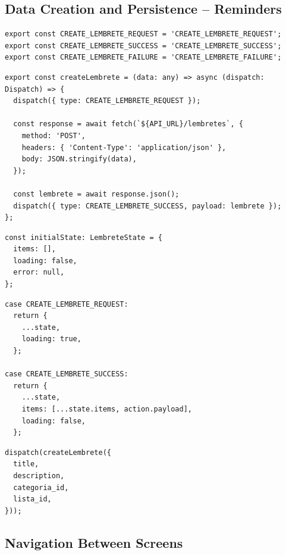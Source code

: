 \documentclass[runningheads,a4paper]{llncs}
\begin{document}
\subsection{Data Creation and Persistence – Reminders}

\begin{lstlisting}[caption={Reminder Creation Action Types}]
export const CREATE_LEMBRETE_REQUEST = 'CREATE_LEMBRETE_REQUEST';
export const CREATE_LEMBRETE_SUCCESS = 'CREATE_LEMBRETE_SUCCESS';
export const CREATE_LEMBRETE_FAILURE = 'CREATE_LEMBRETE_FAILURE';
\end{lstlisting}

\begin{lstlisting}[caption={Asynchronous Reminder Creation Action}]
export const createLembrete = (data: any) => async (dispatch: Dispatch) => {
  dispatch({ type: CREATE_LEMBRETE_REQUEST });

  const response = await fetch(`${API_URL}/lembretes`, {
    method: 'POST',
    headers: { 'Content-Type': 'application/json' },
    body: JSON.stringify(data),
  });

  const lembrete = await response.json();
  dispatch({ type: CREATE_LEMBRETE_SUCCESS, payload: lembrete });
};
\end{lstlisting}

\begin{lstlisting}[caption={Reminder Reducer Initial State}]
const initialState: LembreteState = {
  items: [],
  loading: false,
  error: null,
};
\end{lstlisting}

\begin{lstlisting}[caption={Handling Reminder Creation in Reducer}]
case CREATE_LEMBRETE_REQUEST:
  return {
    ...state,
    loading: true,
  };

case CREATE_LEMBRETE_SUCCESS:
  return {
    ...state,
    items: [...state.items, action.payload],
    loading: false,
  };
\end{lstlisting}

\begin{lstlisting}[caption={Dispatching Reminder Creation from UI}]
dispatch(createLembrete({
  title,
  description,
  categoria_id,
  lista_id,
}));
\end{lstlisting}

\subsection{Navigation Between Screens}
\end{document}
